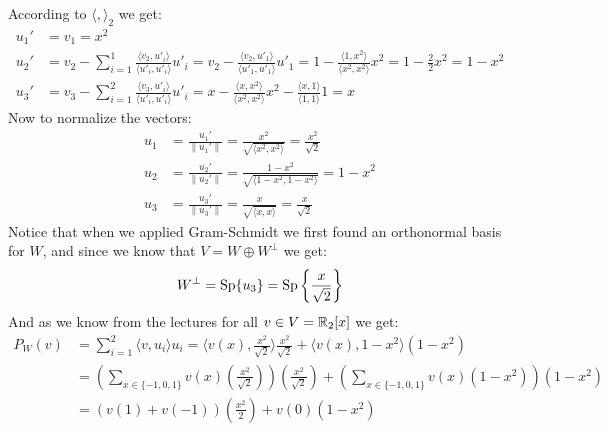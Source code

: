 \documentclass[11pt, a4paper]{article}
\begin{document}
\begin{solution}
\begin{enumerate}
  According to $\langle ,\rangle_2$ we get:
  \begin{align*}
    u_1' &= v_1 = x^2 \\
    u_2' &= v_2 - \sum_{i=1}^{1}
    {\frac{\langle v_2,u'_i\rangle}{\langle u'_i,u'_i\rangle}u'_i} = 
    v_2 - \frac{\langle v_2,u'_1\rangle}{\langle u'_1,u'_1\rangle} u'_1 = 
    1 - \frac{\langle 1,x^2\rangle}{\langle x^2,x^2\rangle} x^2 = 
    1 - \frac{2}{2} x^2 = 1 - x^2 \\
    u_3' &= v_3 - \sum_{i=1}^{2}
    {\frac{\langle v_3,u'_i\rangle}{\langle u'_i,u'_i\rangle}u'_i} = 
    x - \frac{\langle x,x^2\rangle}{\langle x^2,x^2\rangle}x^2 - 
    \frac{\langle x,1\rangle}{\langle 1,1\rangle}1 = 
    x
  \end{align*}
  Now to normalize the vectors:
  \begin{align*}
    u_1 &= \frac{u_1'}{\|u_1'\|} = 
    \frac{x^2}{\sqrt{\langle x^2,x^2\rangle}} = 
    \frac{x^2}{\sqrt{2}}
    \\
    u_2 &= \frac{u_2'}{\|u_2'\|} = 
    \frac{1 - x^2}{\sqrt{\langle 1 - x^2,1 - x^2\rangle}} = 
    1-x^2
    \\
    u_3 &= \frac{u_3'}{\|u_3'\|} = 
    \frac{x}{\sqrt{\langle x, x\rangle}} = 
    \frac{x}{\sqrt{2}}
  \end{align*}
  Notice that when we applied Gram-Schmidt we first found an orthonormal basis
  for $W$, and since we know that $V = W \oplus W^\bot$ we get:
  \[ W^\bot = \mathrm{Sp}\{u_3\} = \mathrm{Sp}\left\{\frac{x}{\sqrt{2}}\right\} \]
  And as we know from the lectures for all $v\in V = \mathbb{R}_2[x]$ we get:
  \begin{align*}
    P_W(v) &= \sum_{i=1}^{2}{\langle v,u_i \rangle u_i} = 
    \langle v(x),\frac{x^2}{\sqrt{2}} \rangle \frac{x^2}{\sqrt{2}} + 
    \langle v(x),1-x^2 \rangle \left(1-x^2\right) \\ &= 
    \left(\sum_{x\in\{-1,0,1\}}
    {v(x)\left(\frac{x^2}{\sqrt{2}}\right)}\right)
    \left(\frac{x^2}{\sqrt{2}}\right) + 
    \left(\sum_{x\in\{-1,0,1\}}{v(x)(1-x^2)}\right)\left(1-x^2\right) \\ &= 
    \left(v(1)+v(-1)\right)\left(\frac{x^2}{2}\right) + v(0)
    \left(1-x^2\right)
  \end{align*}


\end{enumerate}
\end{solution}
\end{document}
